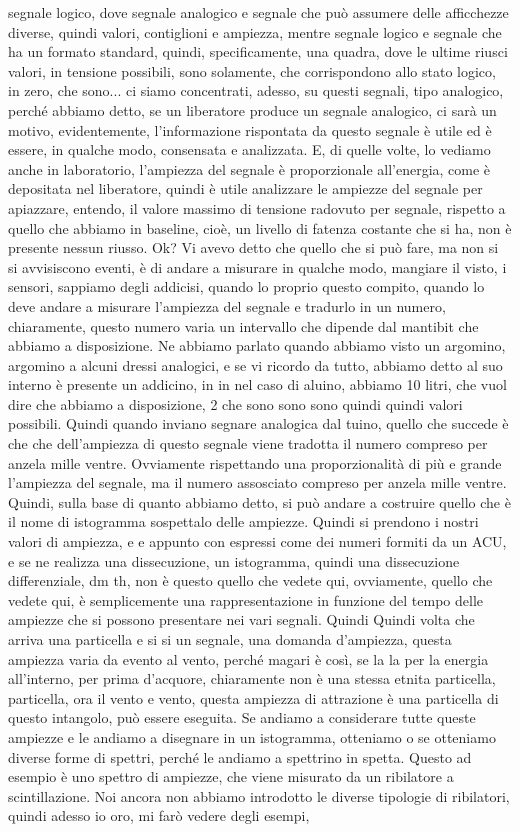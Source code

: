 segnale logico, dove segnale analogico e segnale che può assumere delle afficchezze diverse, quindi valori, contiglioni e ampiezza, mentre segnale logico e segnale che ha un formato standard, quindi, specificamente, una quadra, dove le ultime riusci valori, in tensione possibili, sono solamente, che corrispondono allo stato logico, in zero, che sono... ci siamo concentrati, adesso, su questi segnali, tipo analogico, perché abbiamo detto, se un liberatore produce un segnale analogico, ci sarà un motivo, evidentemente, l'informazione rispontata da questo segnale è utile ed è essere, in qualche modo, consensata e analizzata. E, di quelle volte, lo vediamo anche in laboratorio, l'ampiezza del segnale è proporzionale all'energia, come è depositata nel liberatore, quindi è utile analizzare le ampiezze del segnale per apiazzare, entendo, il valore massimo di tensione radovuto per segnale, rispetto a quello che abbiamo in baseline, cioè, un livello di fatenza costante che si ha, non è presente nessun riusso. Ok? Vi avevo detto che quello che si può fare, ma non si si avvisiscono eventi, è di andare a misurare in qualche modo, mangiare il visto, i sensori, sappiamo degli addicisi, quando lo proprio questo compito, quando lo deve andare a misurare l'ampiezza del segnale e tradurlo in un numero, chiaramente, questo numero varia un intervallo che dipende dal mantibit che abbiamo a disposizione. Ne abbiamo parlato quando abbiamo visto un argomino, argomino a alcuni dressi analogici, e se vi ricordo da tutto, abbiamo detto al suo interno è presente un addicino, in in nel caso di aluino, abbiamo 10 litri, che vuol dire che abbiamo a disposizione, 2 che sono sono sono quindi quindi valori possibili. Quindi quando inviano segnare analogica dal tuino, quello che succede è che che dell'ampiezza di questo segnale viene tradotta il numero compreso per anzela mille ventre. Ovviamente rispettando una proporzionalità di più e grande l'ampiezza del segnale, ma il numero assosciato compreso per anzela mille ventre. Quindi, sulla base di quanto abbiamo detto, si può andare a costruire quello che è il nome di istogramma sospettalo delle ampiezze. Quindi si prendono i nostri valori di ampiezza, e e appunto con espressi come dei numeri formiti da un ACU, e se ne realizza una dissecuzione, un istogramma, quindi una dissecuzione differenziale, dm th, non è questo quello che vedete qui, ovviamente, quello che vedete qui, è semplicemente una rappresentazione in funzione del tempo delle ampiezze che si possono presentare nei vari segnali. Quindi Quindi volta che arriva una particella e si si un segnale, una domanda d'ampiezza, questa ampiezza varia da evento al vento, perché magari è così, se la la per la energia all'interno, per prima d'acquore, chiaramente non è una stessa etnita particella, particella, ora il vento e vento, questa ampiezza di attrazione è una particella di questo intangolo, può essere eseguita. Se andiamo a considerare tutte queste ampiezze e le andiamo a disegnare in un istogramma, otteniamo o se otteniamo diverse forme di spettri, perché le andiamo a spettrino in spetta. Questo ad esempio è uno spettro di ampiezze, che viene misurato da un ribilatore a scintillazione. Noi ancora non abbiamo introdotto le diverse tipologie di ribilatori, quindi adesso io oro, mi farò vedere degli esempi, 